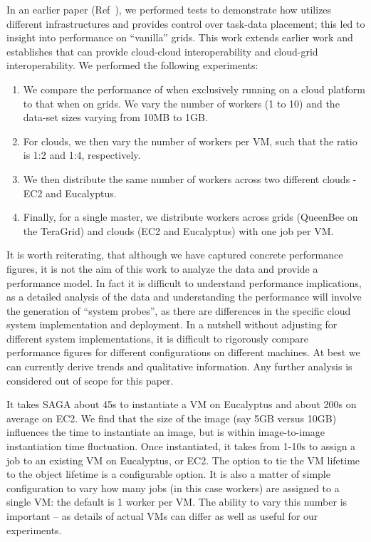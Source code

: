 \documentclass[3p,twocolumn]{elsarticle}
\begin{document}
In an earlier paper (Ref~\cite{saga_ccgrid09}), we performed tests to
demonstrate how \sagamapreduce utilizes different infrastructures and
provides control over task-data placement; this led to insight into
performance on ``vanilla'' grids.  This work extends earlier work and
establishes that \sagamapreduce can provide cloud-cloud
interoperability and cloud-grid interoperability.  We performed the
following experiments:

\begin{enumerate}

 \item We compare the performance of \sagamapreduce when exclusively
 running on a cloud platform to that when on grids. We vary the number
 of workers (1 to 10) and the data-set sizes varying from 10MB to 1GB.

 \item For clouds, we then vary the number of workers per VM, such
 that the ratio is 1:2 and 1:4, respectively.

 \item We then distribute the same number of workers across two
 different clouds - EC2 and Eucalyptus.

 \item Finally, for a single master, we distribute workers across
 grids (QueenBee on the TeraGrid) and clouds (EC2 and Eucalyptus) with
 one job per VM.

\end{enumerate}

It is worth reiterating, that although we have captured concrete
performance figures, it is not the aim of this work to analyze the
data and provide a performance model. In fact it is difficult to
understand performance implications, as a detailed analysis of the
data and understanding the performance will involve the generation of
``system probes'', as there are differences in the specific cloud
system implementation and deployment.  In a nutshell without adjusting
for different system implementations, it is difficult to rigorously
compare performance figures for different configurations on different
machines. At best we can currently derive trends and qualitative
information.  Any further analysis is considered out of scope for this
paper.

It takes SAGA about 45s to instantiate a VM on Eucalyptus and about
200s on average on EC2.  We find that the size of the image (say 5GB
versus 10GB) influences the time to instantiate an image, but is
within image-to-image instantiation time fluctuation.  Once
instantiated, it takes from 1-10s to assign a job to an existing VM on
Eucalyptus, or EC2.  The option to tie the VM lifetime to the
 object lifetime is a configurable option.  It
is also a matter of simple configuration to vary how many jobs (in
this case workers) are assigned to a single VM:  the default is 1
worker per VM.  The ability to vary this number is important -- as
details of actual VMs can differ as well as useful for our
experiments.
\end{document}

